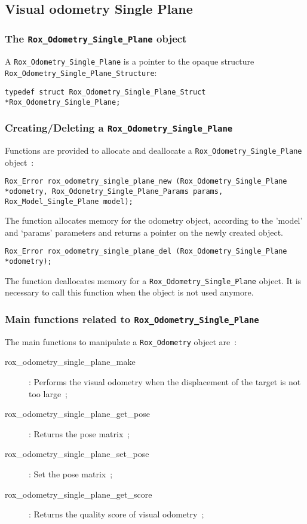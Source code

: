 \subsection{Visual odometry Single Plane}
\label{sse:odometry_single_plane}

\subsubsection{The {\tt Rox\_Odometry\_Single\_Plane} object}
\label{sss:odometry_single_plane_object}

A \lstinline$Rox_Odometry_Single_Plane$ is a pointer to the opaque structure \lstinline$Rox_Odometry_Single_Plane_Structure$:
\begin{lstlisting}
typedef struct Rox_Odometry_Single_Plane_Struct *Rox_Odometry_Single_Plane;
\end{lstlisting}

\subsubsection{Creating/Deleting a {\tt Rox\_Odometry\_Single\_Plane}}
\label{sss:odometry_single_plane_newdel}
Functions are provided to allocate and deallocate a \lstinline$Rox_Odometry_Single_Plane$ object~:

\begin{lstlisting}
Rox_Error rox_odometry_single_plane_new (Rox_Odometry_Single_Plane *odometry, Rox_Odometry_Single_Plane_Params params, Rox_Model_Single_Plane model);
\end{lstlisting}
The function allocates memory for the odometry object, according to
the 'model' and `params' parameters and returns a pointer on the newly created object.

\begin{lstlisting}
Rox_Error rox_odometry_single_plane_del (Rox_Odometry_Single_Plane *odometry);
\end{lstlisting}
The function deallocates memory for a \lstinline$Rox_Odometry_Single_Plane$ object. 
It is necessary to call this function when the object is not used anymore. \\

\subsubsection{Main functions related to {\tt Rox\_Odometry\_Single\_Plane}}
\label{sss:odometry_single_plane_methods}
The main functions to manipulate a \lstinline$Rox_Odometry$ object are~:
\begin{description}
  \item[rox\_odometry\_single\_plane\_make]: Performs the visual odometry when the
  displacement of the target is not too large~;
  \item[rox\_odometry\_single\_plane\_get\_pose]: Returns the pose matrix~;
  \item[rox\_odometry\_single\_plane\_set\_pose]: Set the pose matrix~;
  \item[rox\_odometry\_single\_plane\_get\_score]: Returns the quality score of visual odometry~;
\end{description}

